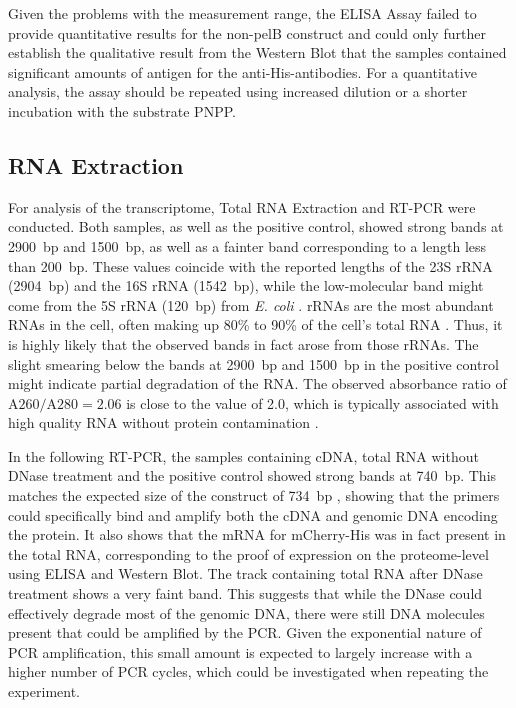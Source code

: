 \documentclass[a4paper,12pt]{article}
\begin{document}
Given the problems with the measurement range, the ELISA Assay failed to provide quantitative results for the non-pelB construct and could only further establish the qualitative result from the Western Blot that the samples contained significant amounts of antigen for the anti-His-antibodies. For a quantitative analysis, the assay should be repeated using increased dilution or a shorter incubation with the substrate PNPP.

\subsection{RNA Extraction}
For analysis of the transcriptome, Total RNA Extraction and RT-PCR were conducted. Both samples, as well as the positive control, showed strong bands at 2900~bp and 1500~bp, as well as a fainter band corresponding to a length less than 200~bp. These values coincide with the reported lengths of the 23S rRNA (2904~bp) and the 16S rRNA (1542~bp), while the low-molecular band might come from the 5S rRNA (120~bp) from \emph{E. coli} \cite{Kaczanowska2007}. rRNAs are the most abundant RNAs in the cell, often making up 80\% to 90\% of the cell's total RNA \cite{Munafo2016}. Thus, it is highly likely that the observed bands in fact arose from those rRNAs. The slight smearing below the bands at 2900~bp and 1500~bp in the positive control might indicate partial degradation of the RNA. The observed absorbance ratio of $\text{A260}/\text{A280}=2.06$ is close to the value of 2.0, which is typically associated with high quality RNA without protein contamination \cite{poovakka2018quality}. 

In the following RT-PCR, the samples containing cDNA, total RNA without DNase treatment and the positive control showed strong bands at 740~bp. This matches the expected size of the construct of 734~bp \cite{Schillberg2025}, showing that the primers could specifically bind and amplify both the cDNA and genomic DNA encoding the protein. It also shows that the mRNA for mCherry-His was in fact present in the total RNA, corresponding to the proof of expression on the proteome-level using ELISA and Western Blot. The track containing total RNA after DNase treatment shows a very faint band. This suggests that while the DNase could effectively degrade most of the genomic DNA, there were still DNA molecules present that could be amplified by the PCR. Given the exponential nature of PCR amplification, this small amount is expected to largely increase with a higher number of PCR cycles, which could be investigated when repeating the experiment.
\end{document}
